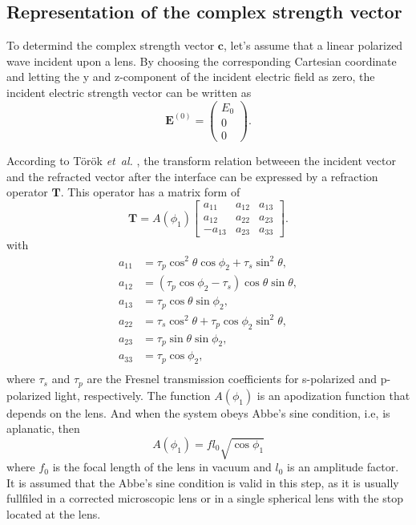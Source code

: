 \documentclass[9pt,twocolumn,twoside]{osajnl}
\begin{document}
\subsection{Representation of the complex strength vector}
To determind the complex strength vector $\mathbf{c}$, let's assume that a linear polarized wave incident upon a lens. By choosing the corresponding Cartesian coordinate and letting the y and z-component of the incident electric field as zero, the incident electric strength vector can be written as
\begin{equation}\label{eq:18}
	\mathbf{E}^{(0)}=
	\begin{pmatrix}
		E_0\\
		0\\
		0
	\end{pmatrix}.
\end{equation}

According to T\"or\"ok \emph{et~al.} \cite{torok1995electromagnetic}, the transform relation betweeen the incident vector and the refracted vector after the interface can be expressed by a refraction operator $\mathbf{T}$. This operator has a matrix form of 
	\begin{equation}\label{eq:19}
		\mathbf{T}=A(\phi_1)
		\begin{bmatrix}
			a_{11} & a_{12} & a_{13}\\
			a_{12} & a_{22} & a_{23}\\
			-a_{13} & a_{23} & a_{33}
		\end{bmatrix}.
	\end{equation}	
with
\begin{equation*}
	\begin{aligned}
		a_{11} &= \tau_p\cos^2\theta\cos\phi_2+\tau_s\sin^2\theta,\\
		a_{12} &= (\tau_p\cos\phi_2-\tau_s)\cos\theta\sin\theta,\\
		a_{13} &= \tau_p\cos\theta\sin\phi_2,\\
		a_{22} &= \tau_s\cos^2\theta+\tau_p\cos\phi_2\sin^2\theta,\\
		a_{23} &= \tau_p\sin\theta\sin\phi_2,\\
		a_{33} &= \tau_p\cos\phi_2,\\	
	\end{aligned}	
\end{equation*}
where $\tau_s$ and $\tau_p$ are the Fresnel transmission coefficients for s-polarized and p-polarized light, respectively. The function $A(\phi_1)$ is an apodization function that depends on the lens. And when the system obeys Abbe's sine condition, i.e, is aplanatic, then
\begin{equation}\label{eq:20}
	A(\phi_1)=f l_0\sqrt{\cos\phi_1}
\end{equation}
where $f_0$ is the focal length of the lens in vacuum and $l_0$ is an amplitude factor. It is assumed that the Abbe's sine condition is valid in this step, as it is usually fullfiled in a corrected microscopic lens or in a single spherical lens with the stop located at the lens.
\end{document}
